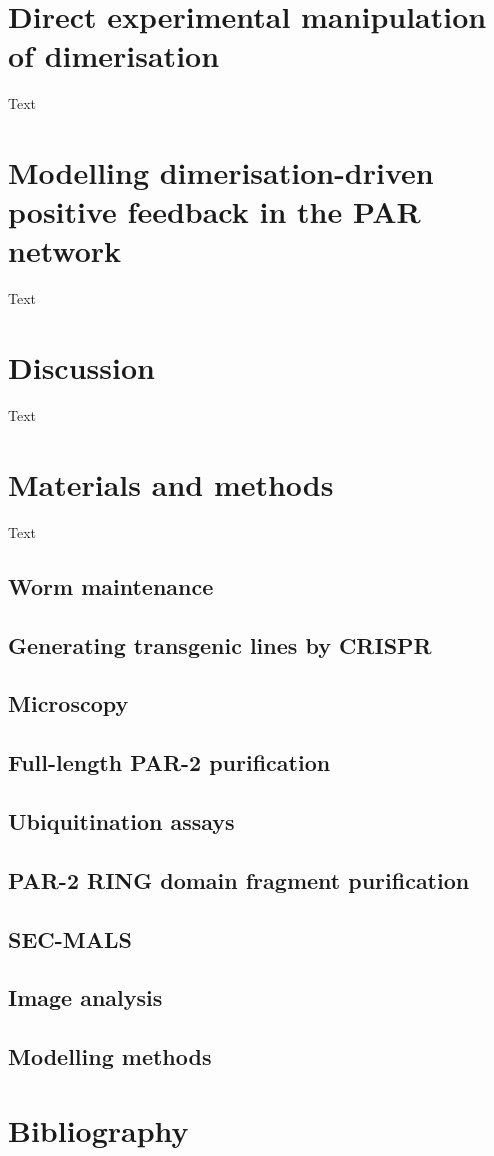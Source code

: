 \documentclass[11pt]{"article"}
\begin{document}
\clearpage
\section{Direct experimental manipulation of dimerisation}

Text

\clearpage
\section{Modelling dimerisation-driven positive feedback in the PAR network}

Text

\clearpage
\section{Discussion}

Text

\clearpage
\section{Materials and methods}

Text

\subsection{Worm maintenance}
\subsection{Generating transgenic lines by CRISPR}
\subsection{Microscopy}
\subsection{Full-length PAR-2 purification}
\subsection{Ubiquitination assays}
\subsection{PAR-2 RING domain fragment purification}
\subsection{SEC-MALS}
\subsection{Image analysis}
\subsection{Modelling methods}

\clearpage
\section{Bibliography}
\end{document}
